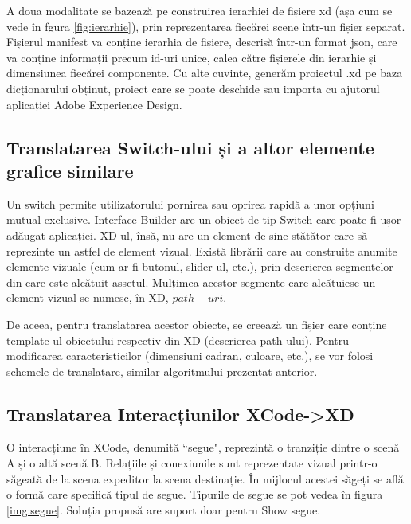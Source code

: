 A doua modalitate se bazează pe construirea ierarhiei de fișiere xd (așa cum se vede în fgura \ref{fig:ierarhie}), prin reprezentarea fiecărei scene într-un fișier separat. Fișierul manifest va conține ierarhia de fișiere, descrisă într-un format json, care va conține informații precum id-uri unice, calea către fișierele din ierarhie și dimensiunea fiecărei componente. Cu alte cuvinte, generăm proiectul .xd pe baza dicționarului obținut, proiect care se poate deschide sau importa cu ajutorul aplicației Adobe Experience Design.

\subsection{Translatarea Switch-ului și a altor elemente grafice similare}

Un switch permite utilizatorului pornirea sau oprirea rapidă a unor opțiuni mutual exclusive. 
Interface Builder are un obiect de tip Switch care poate fi ușor adăugat aplicației. XD-ul, însă, nu are un element de sine stătător care să reprezinte un astfel de element vizual. Există librării care au construite anumite elemente vizuale (cum ar fi butonul, slider-ul, etc.), prin descrierea segmentelor din care este alcătuit assetul. Mulțimea acestor segmente care alcătuiesc un element vizual se numesc, în XD, $path-uri$.

De aceea, pentru translatarea acestor obiecte, se creează un fișier care conține template-ul obiectului respectiv din XD (descrierea path-ului). Pentru modificarea caracteristicilor (dimensiuni cadran, culoare, etc.), se vor folosi schemele de translatare, similar algoritmului prezentat anterior.

\subsection{Translatarea Interacțiunilor XCode->XD}

O interacțiune în XCode, denumită ``segue", reprezintă o tranziție dintre o scenă A și o altă scenă B. Relațiile și conexiunile sunt reprezentate vizual printr-o săgeată de la scena expeditor la scena destinație. În mijlocul acestei săgeți se află o formă care specifică tipul de segue. Tipurile de segue se pot vedea în figura \ref{img:segue}. Soluția propusă are suport doar pentru Show segue.



